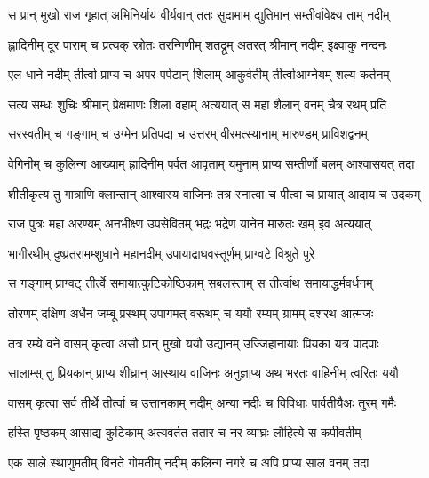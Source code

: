 
\twolineshloka
{स प्रान् मुखो राज गृहात् अभिनिर्याय वीर्यवान्}
{ततः सुदामाम् द्युतिमान् सम्तीर्वावेक्ष्य ताम् नदीम्} %

\twolineshloka
{ह्लादिनीम् दूर पाराम् च प्रत्यक् स्रोतः तरन्गिणीम्}
{शतद्रूम् अतरत् श्रीमान् नदीम् इक्ष्वाकु नन्दनः} %

\twolineshloka
{एल धाने नदीम् तीर्त्वा प्राप्य च अपर पर्पटान्}
{शिलाम् आकुर्वतीम् तीर्त्वाआग्नेयम् शल्य कर्तनम्} %

\twolineshloka
{सत्य सम्धः शुचिः श्रीमान् प्रेक्षमाणः शिला वहाम्}
{अत्ययात् स महा शैलान् वनम् चैत्र रथम् प्रति} %

\twolineshloka
{सरस्वतीम् च गङ्गाम् च उग्मेन प्रतिपद्य च}
{उत्तरम् वीरमत्स्यानाम् भारुण्डम् प्राविशद्वनम्} %

\twolineshloka
{वेगिनीम् च कुलिन्ग आख्याम् ह्रादिनीम् पर्वत आवृताम्}
{यमुनाम् प्राप्य सम्तीर्णो बलम् आश्वासयत् तदा} %

\twolineshloka
{शीतीकृत्य तु गात्राणि क्लान्तान् आश्वास्य वाजिनः}
{तत्र स्नात्वा च पीत्वा च प्रायात् आदाय च उदकम्} %

\twolineshloka
{राज पुत्रः महा अरण्यम् अनभीक्ष्ण उपसेवितम्}
{भद्रः भद्रेण यानेन मारुतः खम् इव अत्ययात्} %

\twolineshloka
{भागीरथीम् दुष्प्रतरामम्शुधाने महानदीम्}
{उपायाद्राघवस्तूर्णम् प्राग्वटे विश्रुते पुरे} %

\twolineshloka
{स गङ्गाम् प्राग्वट् तीर्त्वे समायात्कुटिकोष्ठिकाम्}
{सबलस्ताम् स तीर्त्वाथ समायाद्धर्मवर्धनम्} %

\twolineshloka
{तोरणम् दक्षिण अर्धेन जम्बू प्रस्थम् उपागमत्}
{वरूथम् च ययौ रम्यम् ग्रामम् दशरथ आत्मजः} %

\twolineshloka
{तत्र रम्ये वने वासम् कृत्वा असौ प्रान् मुखो ययौ}
{उद्यानम् उज्जिहानायाः प्रियका यत्र पादपाः} %

\twolineshloka
{सालाम्स् तु प्रियकान् प्राप्य शीघ्रान् आस्थाय वाजिनः}
{अनुज्ञाप्य अथ भरतः वाहिनीम् त्वरितः ययौ} %

\twolineshloka
{वासम् कृत्वा सर्व तीर्थे तीर्त्वा च उत्तानकाम् नदीम्}
{अन्या नदीः च विविधाः पार्वतीयैअः तुरम् गमैः} %

\twolineshloka
{हस्ति पृष्ठकम् आसाद्य कुटिकाम् अत्यवर्तत}
{ततार च नर व्याघ्रः लौहित्ये स कपीवतीम्} %

\twolineshloka
{एक साले स्थाणुमतीम् विनते गोमतीम् नदीम्}
{कलिन्ग नगरे च अपि प्राप्य साल वनम् तदा} %

